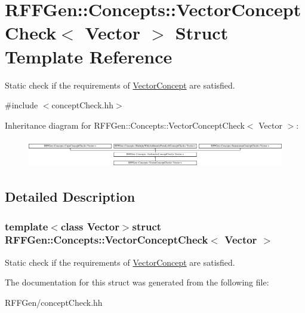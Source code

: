 \hypertarget{structRFFGen_1_1Concepts_1_1VectorConceptCheck}{\section{R\-F\-F\-Gen\-:\-:Concepts\-:\-:Vector\-Concept\-Check$<$ Vector $>$ Struct Template Reference}
\label{structRFFGen_1_1Concepts_1_1VectorConceptCheck}
}


Static check if the requirements of \hyperlink{structRFFGen_1_1Concepts_1_1VectorConcept}{Vector\-Concept} are satisfied.  




{\ttfamily \#include $<$concept\-Check.\-hh$>$}

Inheritance diagram for R\-F\-F\-Gen\-:\-:Concepts\-:\-:Vector\-Concept\-Check$<$ Vector $>$\-:\begin{figure}[H]
\begin{center}
\leavevmode
\includegraphics[height=1.241685cm]{structRFFGen_1_1Concepts_1_1VectorConceptCheck}
\end{center}
\end{figure}


\subsection{Detailed Description}
\subsubsection*{template$<$class Vector$>$struct R\-F\-F\-Gen\-::\-Concepts\-::\-Vector\-Concept\-Check$<$ Vector $>$}

Static check if the requirements of \hyperlink{structRFFGen_1_1Concepts_1_1VectorConcept}{Vector\-Concept} are satisfied. 

The documentation for this struct was generated from the following file\-:\begin{DoxyCompactItemize}
\item 
R\-F\-F\-Gen/concept\-Check.\-hh\end{DoxyCompactItemize}
